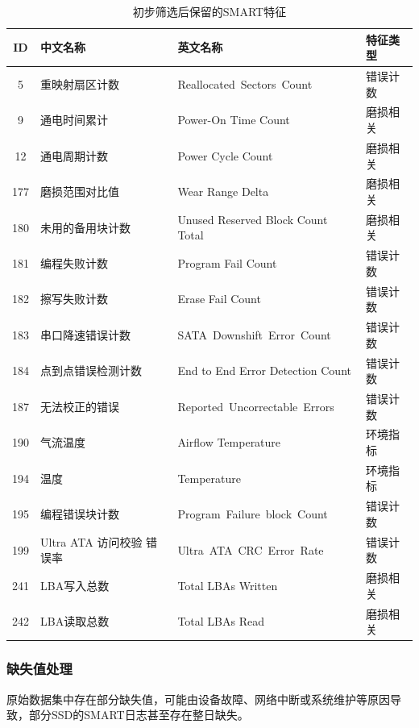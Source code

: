 \begin{table}[htbp]
    \caption{\label{tab:smart-features}初步筛选后保留的SMART特征}
    \begin{tabularx}{\linewidth}{cX<{\centering}X<{\centering}X<{\centering}}
        \toprule
        ID & 中文名称 & 英文名称 & 特征类型 \\
        \midrule
        5 & 重映射扇区计数 & \mbox{Reallocated Sectors Count} & 错误计数 \\
        9 & 通电时间累计 & Power-On Time Count & 磨损相关 \\
        12 & 通电周期计数 & Power Cycle Count & 磨损相关 \\
        177 & 磨损范围对比值 & Wear Range Delta & 磨损相关 \\
        180 & 未用的备用块计数 & Unused Reserved Block Count Total & 磨损相关 \\
        181 & 编程失败计数 & Program Fail Count & 错误计数 \\
        182 & 擦写失败计数 & Erase Fail Count & 错误计数 \\
        183 & 串口降速错误计数 & \mbox{SATA Downshift Error Count} & 错误计数 \\
        184 & 点到点错误检测计数 & End to End Error Detection Count & 错误计数 \\
        187 & 无法校正的错误 & \mbox{Reported Uncorrectable Errors} & 错误计数 \\
        190 & 气流温度 & Airflow Temperature & 环境指标 \\
        194 & 温度 & Temperature & 环境指标 \\
        195 & 编程错误块计数 & \mbox{Program Failure block Count} & 错误计数 \\
        199 & Ultra ATA 访问校验 \newline 错误率 & \mbox{Ultra ATA CRC Error Rate} & 错误计数 \\
        241 & LBA写入总数 & Total LBAs Written & 磨损相关 \\
        242 & LBA读取总数 & Total LBAs Read & 磨损相关 \\
        \bottomrule
    \end{tabularx}
\end{table}

\subsubsection{缺失值处理}

原始数据集中存在部分缺失值，可能由设备故障、网络中断或系统维护等原因导致，部分SSD的SMART日志甚至存在整日缺失。

